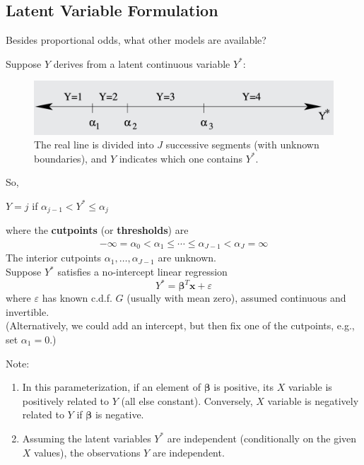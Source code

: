 \documentclass[11pt]{elegantbook}
\begin{document}
\subsection{Latent Variable Formulation}
Besides proportional odds, what other models are available?
\begin{definition}
    \normalfont
    Suppose $Y$ derives from a latent continuous variable $Y^*$:
\end{definition}
\begin{figure}[htbp]
    \centering
    \includegraphics[scale=0.2]{LVF.png}
    \caption{The real line is divided into $J$ successive segments (with unknown boundaries), and $Y$ indicates which one contains $Y^*$.}
    \label{}
\end{figure}
\begin{definition}
    \normalfont
    So,
    \begin{center}
        $Y=j$ if $\alpha_{j-1}<Y^*\leq \alpha_j$
    \end{center}
    where the \textbf{cutpoints} (or \textbf{thresholds}) are
    \begin{equation}
        \begin{aligned}
            -\infty=\alpha_0<\alpha_1\leq\cdots\leq\alpha_{J-1}<\alpha_J=\infty
        \end{aligned}
        \nonumber
    \end{equation}
    The interior cutpoints $\alpha_1, \ldots, \alpha_{J-1}$ are unknown.\\
    Suppose $Y^*$ satisfies a no-intercept linear regression
    $$
    Y^*=\boldsymbol{\beta}^T \boldsymbol{x}+\varepsilon
    $$
    where $\varepsilon$ has known c.d.f. $G$ (usually with mean zero), assumed continuous and invertible.\\
    (Alternatively, we could add an intercept, but then fix one of the cutpoints, e.g., set $\alpha_1=0$.)
\end{definition}
Note:
\begin{enumerate}[$\bullet$]
    \item In this parameterization, if an element of $\boldsymbol{\beta}$ is positive, its $X$ variable is positively related to $Y$ (all else constant). Conversely, $X$ variable is negatively related to $Y$ if $\boldsymbol{\beta}$ is negative.
    \item Assuming the latent variables $Y^*$ are independent (conditionally on the given $X$ values), the observations $Y$ are independent.
\end{enumerate}
\end{document}
